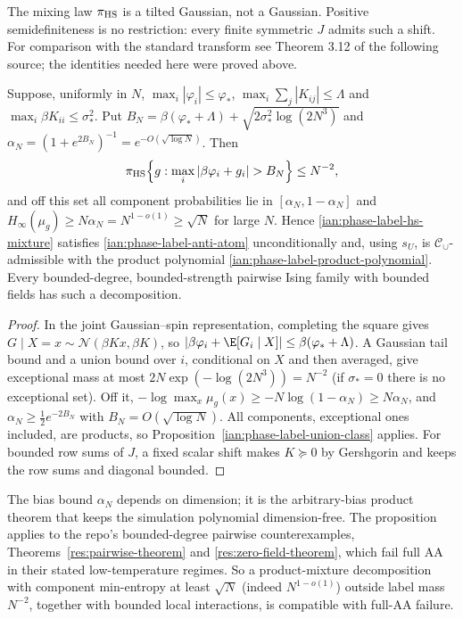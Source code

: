The mixing law \(\pi_{\rm HS}\) is a tilted Gaussian, not a Gaussian.
Positive semidefiniteness is no restriction: every finite symmetric
\(J\) admits such a shift. For comparison with the standard transform
see Theorem 3.12 of the following source; the identities needed here
were proved above.

\begin{proposition}
\label{ian:phase-label-hs-admissibility}
Suppose, uniformly in \(N\),
\(\max_i|\varphi_i|\le\varphi_*\),
\(\max_i\sum_j|K_{ij}|\le\Lambda\) and
\(\max_i\beta K_{ii}\le\sigma_*^2\). Put
\(B_N=\beta(\varphi_*+\Lambda)+\sqrt{2\sigma_*^2\log(2N^3)}\) and
\(\alpha_N=(1+e^{2B_N})^{-1}=e^{-O(\sqrt{\log N})}\). Then
\[
 \pi_{\rm HS}\Bigl\{g:\max_i|\beta\varphi_i+g_i|>B_N\Bigr\}\le N^{-2},
\]
and off this set all component probabilities lie in
\([\alpha_N,1-\alpha_N]\) and
\(H_\infty(\mu_g)\ge N\alpha_N=N^{1-o(1)}\ge\sqrt N\) for large \(N\).
Hence \eqref{ian:phase-label-hs-mixture} satisfies
\eqref{ian:phase-label-anti-atom} unconditionally and, using
\(s_U\), is \(\mathcal C_\cup\)-admissible with the product
polynomial \eqref{ian:phase-label-product-polynomial}. Every
bounded-degree, bounded-strength pairwise Ising family with bounded
fields has such a decomposition.
\end{proposition}

\begin{proof}
In the joint Gaussian--spin representation, completing the square gives
\(G\mid X=x\sim\mathcal N(\beta Kx,\beta K)\), so
\(|\beta\varphi_i+\E[G_i\mid X]|\le\beta(\varphi_*+\Lambda)\). A Gaussian
tail bound and a union bound over \(i\), conditional on \(X\) and then
averaged, give exceptional mass at most
\(2N\exp(-\log(2N^3))=N^{-2}\) (if \(\sigma_*=0\) there is no
exceptional set). Off it,
\(-\log\max_x\mu_g(x)\ge-N\log(1-\alpha_N)\ge N\alpha_N\), and
\(\alpha_N\ge\frac12e^{-2B_N}\) with \(B_N=O(\sqrt{\log N})\). All
components, exceptional ones included, are products, so
Proposition~\ref{ian:phase-label-union-class} applies. For bounded row
sums of \(J\), a fixed scalar shift makes \(K\succeq0\) by Gershgorin and
keeps the row sums and diagonal bounded.
\end{proof}

The bias bound \(\alpha_N\) depends on dimension; it is the
arbitrary-bias product theorem that keeps the simulation polynomial
dimension-free. The proposition applies to the repo's bounded-degree
pairwise counterexamples, Theorems~\ref{res:pairwise-theorem} and
\ref{res:zero-field-theorem}, which fail full AA in their stated
low-temperature regimes. So a product-mixture
decomposition with component min-entropy at least \(\sqrt N\) (indeed
\(N^{1-o(1)}\)) outside label mass \(N^{-2}\), together with bounded
local interactions, is compatible with full-AA failure.

